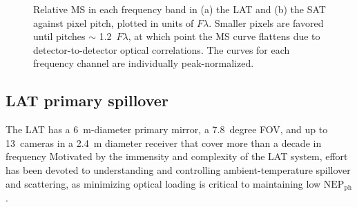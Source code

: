 \begin{figure}[!t]
    \hfill
    \caption[Sensitivity comparison between candidate SO LAT configurations]{Relative MS in each frequency band in (a) the LAT and (b) the SAT against pixel pitch, plotted in units of $F \lambda$. Smaller pixels are favored until pitches $\sim$ 1.2~$F \lambda$, at which point the MS curve flattens due to detector-to-detector optical correlations. The curves for each frequency channel are individually peak-normalized.}
    \label{fig:so_pixel_pitch}
\end{figure}


\subsection{LAT primary spillover}
\label{sec:bolocalc_primary_spillover}

The LAT has a 6~m-diameter primary mirror, a 7.8~degree FOV, and up to 13~cameras in a 2.4~m diameter receiver that cover more than a decade in frequency 
Motivated by the immensity and complexity of the LAT system, effort has been devoted to understanding and controlling ambient-temperature spillover and scattering, 
as minimizing optical loading is critical to maintaining low $\mathrm{NEP}_{\mathrm{ph}}$. 

